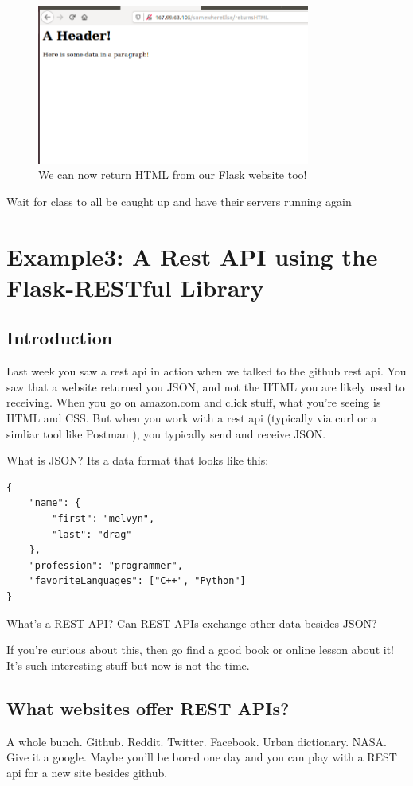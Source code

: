 \documentclass[10pt]{article}
\begin{document}
\begin{figure}[h]
  \centering
    \includegraphics[width=0.8\textwidth]{somewhereElse_returnsHTML.png}
  \caption{We can now return HTML from our Flask website too!}
\label{fig:returnshtml}
\end{figure}

{\LARGE Wait for class to all be caught up and have their servers running again}

\section{Example3: A Rest API using the Flask-RESTful Library}
\subsection{Introduction}
Last week you saw a rest api in action when we talked to the github rest api.
You saw that a website returned you JSON, and not the HTML you are likely used
to receiving. When you go on amazon.com and click stuff, what you're seeing is
HTML and CSS. But when you work with a rest api (typically via curl or a simliar
tool like Postman ), you typically send and receive JSON.

What is JSON? Its a data format that looks like this:

\begin{verbatim}
{
	"name": {
		"first": "melvyn",
		"last": "drag"
	},
	"profession": "programmer",
	"favoriteLanguages": ["C++", "Python"]
}
\end{verbatim}

What's a REST API? Can REST APIs exchange other data besides JSON? 

If you're curious about this, then go find a good book or online lesson about
it! It's such interesting stuff but now is not the time.

\subsection{What websites offer REST APIs?}
A whole bunch. Github. Reddit. Twitter. Facebook. Urban dictionary. NASA. Give
it a google. Maybe you'll be bored one day and you can play with a REST api for
a new site besides github.
\end{document}
